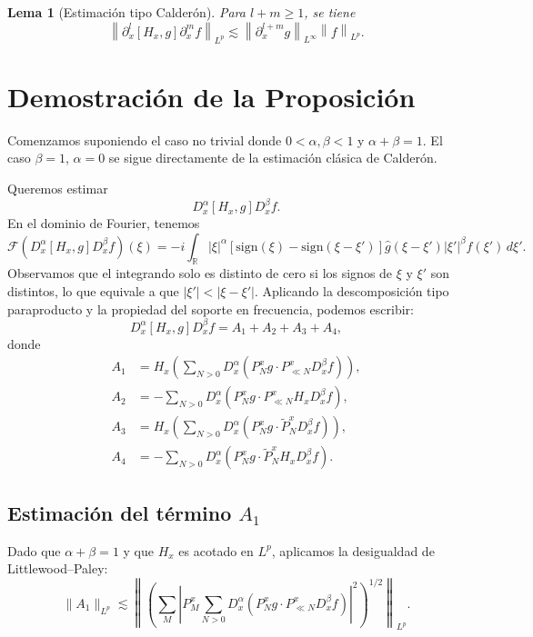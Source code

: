 \documentclass{aleph-revista}
\newtheorem{lemma}{Lema}
\begin{document}
\begin{lemma}[Estimación tipo Calderón]
Para $l + m \geq 1$, se tiene
\[
\left\| \partial_x^l [H_x, g] \partial_x^m f \right\|_{L^p} \lesssim \left\| \partial_x^{l + m} g \right\|_{L^\infty} \left\| f \right\|_{L^p}.
\]
\end{lemma}
\section{Demostración de la Proposición}

Comenzamos suponiendo el caso no trivial donde $0 < \alpha, \beta < 1$ y $\alpha + \beta = 1$. El caso $\beta = 1$, $\alpha = 0$ se sigue directamente de la estimación clásica de Calderón.

Queremos estimar
\[
D_x^\alpha [H_x, g] D_x^\beta f.
\]
En el dominio de Fourier, tenemos
\[
\mathcal{F} \left( D_x^\alpha [H_x, g] D_x^\beta f \right)(\xi) = -i \int_{\mathbb{R}} |\xi|^\alpha \left[ \mathrm{sign}(\xi) - \mathrm{sign}(\xi - \xi') \right] \widehat{g}(\xi - \xi') |\xi'|^\beta \widehat{f}(\xi') \, d\xi'.
\]
Observamos que el integrando solo es distinto de cero si los signos de $\xi$ y $\xi'$ son distintos, lo que equivale a que $|\xi'| < |\xi - \xi'|$.
Aplicando la descomposici\'on tipo paraproducto y la propiedad del soporte en frecuencia, podemos escribir:
\[
D_x^\alpha [H_x, g] D_x^\beta f = A_1 + A_2 + A_3 + A_4,
\]
donde
\begin{align*}
A_1 &= H_x \left( \sum_{N>0} D_x^\alpha (P_N^x g \cdot P_{\ll N}^x D_x^\beta f) \right), \\
A_2 &= - \sum_{N>0} D_x^\alpha (P_N^x g \cdot P_{\ll N}^x H_x D_x^\beta f), \\
A_3 &= H_x \left( \sum_{N>0} D_x^\alpha (P_N^x g \cdot \widetilde{P}_N^x D_x^\beta f) \right), \\
A_4 &= - \sum_{N>0} D_x^\alpha (P_N^x g \cdot \widetilde{P}_N^x H_x D_x^\beta f).
\end{align*}

\subsection*{Estimaci\'on del t\'ermino $A_1$}

Dado que $\alpha + \beta = 1$ y que $H_x$ es acotado en $L^p$, aplicamos la desigualdad de Littlewood--Paley:
\[
\|A_1\|_{L^p} \lesssim \left\| \left( \sum_{M} |P_M^x \sum_{N > 0} D_x^\alpha (P_N^x g \cdot P_{\ll N}^x D_x^\beta f)|^2 \right)^{1/2} \right\|_{L^p}.
\]
\end{document}
